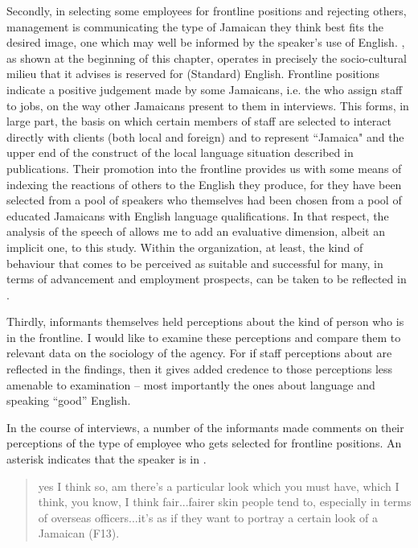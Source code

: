 Secondly, in selecting some employees for frontline positions and rejecting others,  management is communicating the type of Jamaican they think best fits the desired image, one which may well be informed by the speaker’s use of English.  , as shown at the beginning of this chapter, operates in precisely the socio-cultural milieu that it advises is reserved for (Standard) English.  Frontline positions indicate a positive judgement made by some Jamaicans, i.e. the  who assign staff to jobs, on the way other Jamaicans present to them in interviews.  This forms, in large part, the basis on which certain members of staff are selected to interact directly with clients (both local and foreign) and to represent ``Jamaica" and the upper end of the construct of the local language situation described in  publications.  Their promotion into the frontline provides us with some means of indexing the reactions of others to the English they produce, for they have been selected from a pool of speakers who themselves had been chosen from a pool of educated Jamaicans with English language qualifications.  In that respect, the analysis of the speech of  allows me to add an evaluative dimension, albeit an implicit one, to this study.  Within the organization, at least, the kind of behaviour that comes to be perceived as suitable and successful for many, in terms of advancement and employment prospects, can be taken to be reflected in .      

Thirdly, informants themselves held perceptions about the kind of person who is in the frontline.  I would like to examine these perceptions and compare them to relevant data on the sociology of the agency.  For if staff perceptions about  are reflected in the findings, then it gives added credence to those perceptions less amenable to examination – most importantly the ones about language and speaking “good” English. 

In the course of interviews, a number of the informants made comments on their perceptions of the type of employee who gets selected for frontline positions.  An asterisk indicates that the speaker is in .    

\begin{quote}
	yes I think so, am there’s a particular look which you must have, which I think, you know, I think fair...fairer skin people tend to, especially in terms of overseas officers...it’s as if they want to portray a certain look of a Jamaican (F13).
\end{quote}

